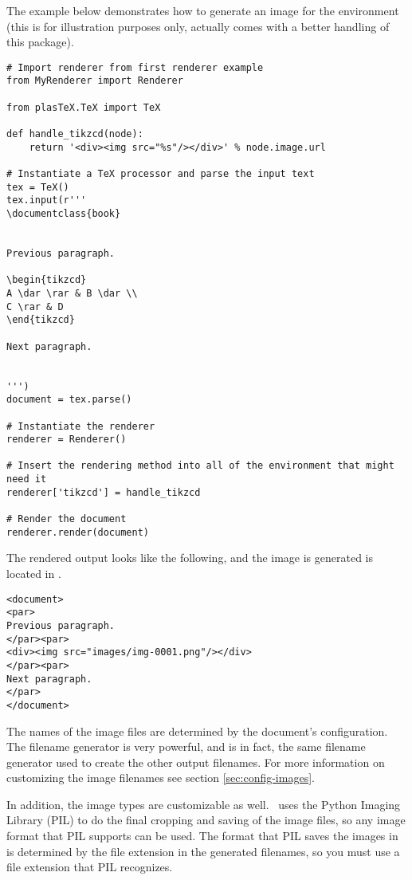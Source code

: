 The example below demonstrates how to generate an image for the
 environment (this is for illustration purposes only,
\plasTeX actually comes with a better handling of this package).
\begin{verbatim}
# Import renderer from first renderer example
from MyRenderer import Renderer

from plasTeX.TeX import TeX

def handle_tikzcd(node):
    return '<div><img src="%s"/></div>' % node.image.url

# Instantiate a TeX processor and parse the input text
tex = TeX()
tex.input(r'''
\documentclass{book}


Previous paragraph.

\begin{tikzcd}
A \dar \rar & B \dar \\
C \rar & D
\end{tikzcd}

Next paragraph.


''')
document = tex.parse()

# Instantiate the renderer
renderer = Renderer()

# Insert the rendering method into all of the environment that might need it
renderer['tikzcd'] = handle_tikzcd

# Render the document
renderer.render(document)
\end{verbatim}

The rendered output looks like the following, and the image is generated
is located in .
\begin{verbatim}
<document>
<par>
Previous paragraph.
</par><par>
<div><img src="images/img-0001.png"/></div>
</par><par>
Next paragraph.
</par>
</document>
\end{verbatim}

The names of the image files are determined by the document's configuration.
The filename generator is very powerful, and is in fact, the same filename
generator used to create the other output filenames.  For more information
on customizing the image filenames see section \ref{sec:config-images}.

In addition, the image types are customizable as well.  \plasTeX\ uses
the Python Imaging Library (PIL) to do the final cropping and saving of the
image files, so any image format that PIL supports can be used.  The
format that PIL saves the images in is determined by the file extension
in the generated filenames, so you must use a file extension that
PIL recognizes.

